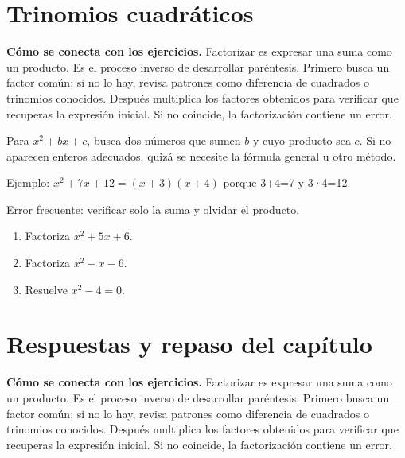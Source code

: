 \documentclass[10pt,oneside,openany]{book}
\begin{document}
\section{Trinomios cuadráticos}

\textbf{Cómo se conecta con los ejercicios.} Factorizar es expresar una suma como un producto. Es el proceso inverso de desarrollar paréntesis. Primero busca un factor común; si no lo hay, revisa patrones como diferencia de cuadrados o trinomios conocidos. Después multiplica los factores obtenidos para verificar que recuperas la expresión inicial. Si no coincide, la factorización contiene un error.

Para $x^2+bx+c$, busca dos números que sumen $b$ y cuyo producto sea $c$. Si no aparecen enteros adecuados, quizá se necesite la fórmula general u otro método.

\begin{ejemplo}
Ejemplo: $x^2+7x+12=(x+3)(x+4)$ porque 3+4=7 y 3·4=12.
\end{ejemplo}

\begin{ojo}
Error frecuente: verificar solo la suma y olvidar el producto.
\end{ojo}

\begin{practica}

\begin{enumerate}

\item Factoriza $x^2+5x+6$.

\item Factoriza $x^2-x-6$.

\item Resuelve $x^2-4=0$.

\end{enumerate}

\end{practica}



\section{Respuestas y repaso del capítulo}

\textbf{Cómo se conecta con los ejercicios.} Factorizar es expresar una suma como un producto. Es el proceso inverso de desarrollar paréntesis. Primero busca un factor común; si no lo hay, revisa patrones como diferencia de cuadrados o trinomios conocidos. Después multiplica los factores obtenidos para verificar que recuperas la expresión inicial. Si no coincide, la factorización contiene un error.
\end{document}
